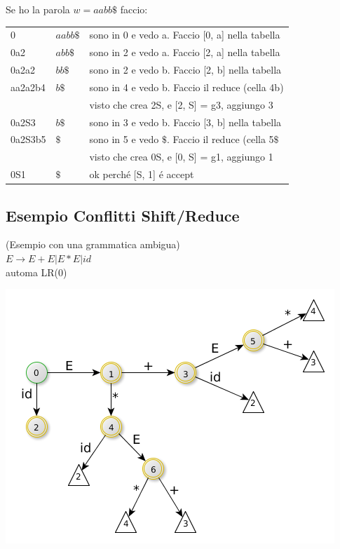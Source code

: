 Se ho la parola $w = aabb\$$ faccio:
\begin{tabular}{|lll|}
	\hline
	0 			& 	$aabb\$$ 	& 	sono in 0 e vedo a. Faccio [0, a] nella tabella \\
	0a2			& 	$abb\$$ 	& 	sono in 2 e vedo a. Faccio [2, a] nella tabella \\
	0a2a2		& 	$bb\$$ 		& 	sono in 2 e vedo b. Faccio [2, b] nella tabella \\
	aa2a2b4 	& 	$b\$$ 		& 	sono in 4 e vedo b. Faccio il reduce (cella 4b) \\
				&				&	visto che crea 2S, e [2, S] = g3, aggiungo 3 	\\
	0a2S3		& 	$b\$$ 		& 	sono in 3 e vedo b. Faccio [3, b] nella tabella \\
	0a2S3b5		& 	$\$$ 		& 	sono in 5 e vedo $\$$. Faccio il reduce (cella 5$\$$ \\
				&				&	visto che crea 0S, e [0, S] = g1, aggiungo 1 	\\
	0S1			& 	$\$$ 		& 	ok perch\'e [S, 1] \'e accept 					\\
	\hline
\end{tabular}

\subsection{Esempio Conflitti Shift/Reduce}
(Esempio con una grammatica ambigua)\\

$E \rightarrow E + E | E * E | id $\\
automa LR(0)

\begin{center}
    \includegraphics[scale=0.6]{Chapters/Img/c02_17.png}\\
\end{center} 

